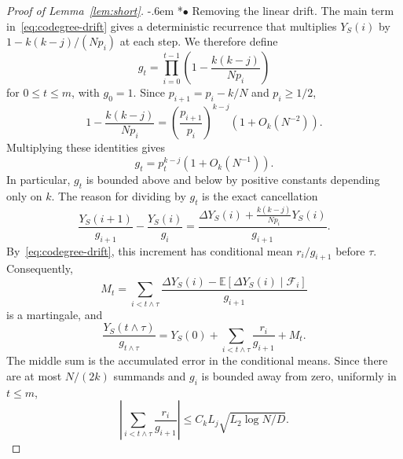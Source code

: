 \documentclass[11pt,reqno]{amsart}
\makeatletter
\numberwithin{equation}{section}
\renewcommand{\paragraph}{\@startsection{paragraph}{4}%
    \z@{.75\linespacing\@plus.2\linespacing\@minus.1\linespacing}%
    {-.6em}%
    {\normalfont\bfseries}}
\newcommand{\proofparagraph}[1]{%
    \paragraph*{$\bullet$ #1}\ignorespaces}
\theoremstyle{plain}
\theoremstyle{definition}
\newcommand{\E}{\mathbb E}
\makeatother
\begin{document}
\begin{proof}[Proof of Lemma~\ref{lem:short}]
    \proofparagraph{Removing the linear drift.}
    The main term in~\eqref{eq:codegree-drift} gives a deterministic recurrence that multiplies $Y_S(i)$ by $1-k(k-j)/(Np_i)$ at each step.
    We therefore define
    \[
        g_t=\prod_{i=0}^{t-1}\left(1-\frac{k(k-j)}{Np_i}\right)
    \]
    for $0\le t\le m$, with $g_0=1$.
    Since $p_{i+1}=p_i-k/N$ and $p_i\ge1/2$,
    \[
        1-\frac{k(k-j)}{Np_i}
        =\left(\frac{p_{i+1}}{p_i}\right)^{k-j}
        \left(1+O_k(N^{-2})\right).
    \]
    Multiplying these identities gives
    \begin{equation}\label{eq:greedy-decay}
        g_t=p_t^{k-j}\left(1+O_k(N^{-1})\right).
    \end{equation}
    In particular, $g_t$ is bounded above and below by positive constants depending only on $k$.
    The reason for dividing by $g_t$ is the exact cancellation
    \[
        \frac{Y_S(i+1)}{g_{i+1}}-\frac{Y_S(i)}{g_i}
        =\frac{\Delta Y_S(i)+\frac{k(k-j)}{Np_i}Y_S(i)}{g_{i+1}}.
    \]
    By~\eqref{eq:codegree-drift}, this increment has conditional mean $r_i/g_{i+1}$ before $\tau$.
    Consequently,
    \[
        M_t=\sum_{i<t\wedge\tau}
        \frac{\Delta Y_S(i)-\E[\Delta Y_S(i)\mid\mathcal F_i]}{g_{i+1}}
    \]
    is a martingale, and
    \begin{equation}\label{eq:codegree-decomposition}
        \frac{Y_S(t\wedge\tau)}{g_{t\wedge\tau}}
        =Y_S(0)+\sum_{i<t\wedge\tau}\frac{r_i}{g_{i+1}}+M_t.
    \end{equation}
    The middle sum is the accumulated error in the conditional means.
    Since there are at most $N/(2k)$ summands and $g_i$ is bounded away from zero, uniformly in $t\le m$,
    \begin{equation}\label{eq:codegree-drift-error}
        \left|\sum_{i<t\wedge\tau}\frac{r_i}{g_{i+1}}\right|
        \le C_kL_j\sqrt{L_2\log N/D}.
    \end{equation}


\end{proof}
\end{document}
